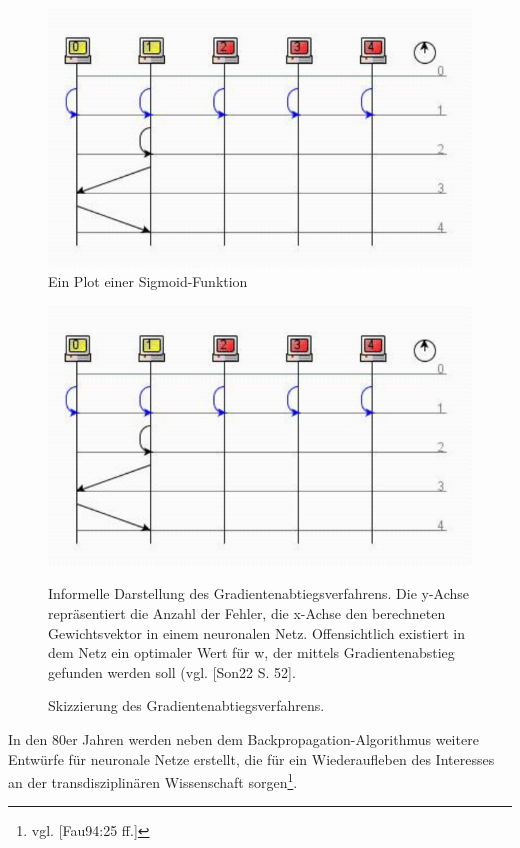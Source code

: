 \begin{figure}[h]
    \centering
    \includegraphics{images/p1ReadSeq.pdf}
    \caption{Ein Plot einer Sigmoid-Funktion}
    \label{fig-sigmoid}
\end{figure}


\begin{figure}[h]
    \centering
    \includegraphics{images/p1ReadSeq.pdf}
    \caption{Skizzierung des Gradientenabtiegsverfahrens.}
    \label{fig-gradient}
    \small
    Informelle Darstellung des Gradientenabtiegsverfahrens. Die y-Achse repräsentiert die Anzahl der Fehler, die x-Achse den berechneten Gewichtsvektor in einem neuronalen Netz. Offensichtlich existiert in dem Netz ein optimaler Wert für w, der mittels Gradientenabstieg gefunden werden soll (vgl. [Son22 S. 52].
\end{figure}

In den 80er Jahren werden neben dem Backpropagation-Algorithmus weitere Entwürfe für neuronale Netze erstellt, die für ein Wiederaufleben des Interesses an der transdisziplinären Wissenschaft sorgen\footnote{vgl. [Fau94:25 ff.]}.

